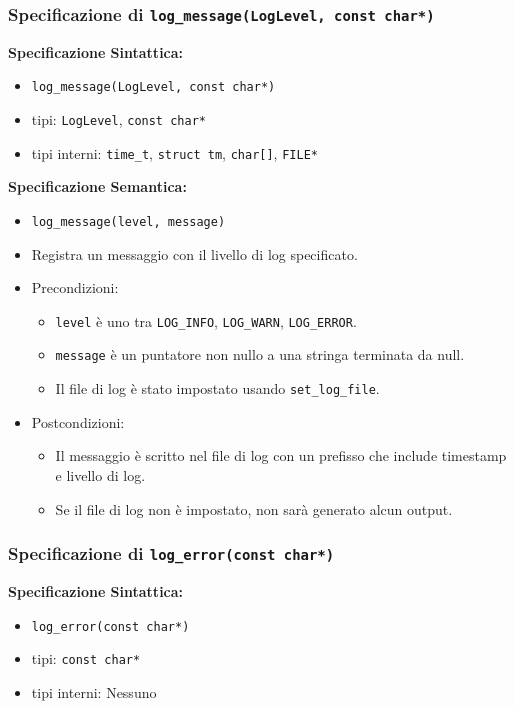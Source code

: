\documentclass[11pt]{scrartcl} %
\begin{document}
\subsubsection{Specificazione di \texttt{log\_message(LogLevel, const char*)}}

\textbf{Specificazione Sintattica:}
\begin{itemize}
	\item \texttt{log\_message(LogLevel, const char*)}
	\item tipi: \texttt{LogLevel}, \texttt{const char*}
	\item tipi interni: \texttt{time\_t}, \texttt{struct tm}, \texttt{char[]}, \texttt{FILE*}
\end{itemize}

\textbf{Specificazione Semantica:}
\begin{itemize}
	\item \texttt{log\_message(level, message)}
	\item Registra un messaggio con il livello di log specificato.
	\item Precondizioni:
	      \begin{itemize}
		      \item \texttt{level} è uno tra \texttt{LOG\_INFO}, \texttt{LOG\_WARN}, \texttt{LOG\_ERROR}.
		      \item \texttt{message} è un puntatore non nullo a una stringa terminata da null.
		      \item Il file di log è stato impostato usando \texttt{set\_log\_file}.
	      \end{itemize}
	\item Postcondizioni:
	      \begin{itemize}
		      \item Il messaggio è scritto nel file di log con un prefisso che include timestamp e livello di log.
		      \item Se il file di log non è impostato, non sarà generato alcun output.
	      \end{itemize}
\end{itemize}

\subsubsection{Specificazione di \texttt{log\_error(const char*)}}

\textbf{Specificazione Sintattica:}
\begin{itemize}
	\item \texttt{log\_error(const char*)}
	\item tipi: \texttt{const char*}
	\item tipi interni: Nessuno
\end{itemize}
\end{document}
